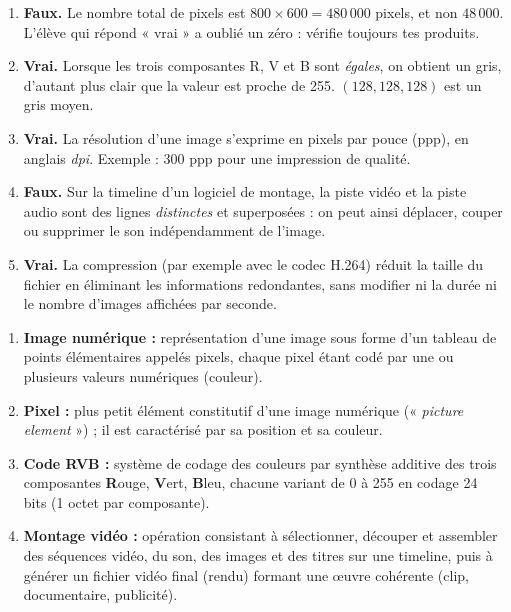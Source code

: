 \documentclass[11pt]{article}
\newcommand{\cle}[1]{{\popxbold\color{popdark}#1}}
\begin{document}
\begin{corrige}
\begin{enumerate}
  \item \textbf{Faux.} Le nombre total de pixels est $800 \times 600 = 480\,000$ pixels, et non $48\,000$. L'élève qui répond « vrai » a oublié un zéro : vérifie toujours tes produits.
  \item \textbf{Vrai.} Lorsque les trois composantes R, V et B sont \emph{égales}, on obtient un gris, d'autant plus clair que la valeur est proche de 255. $(128, 128, 128)$ est un gris moyen.
  \item \textbf{Vrai.} La \cle{résolution} d'une image s'exprime en pixels par pouce (ppp), en anglais \emph{dpi}. Exemple : 300 ppp pour une impression de qualité.
  \item \textbf{Faux.} Sur la timeline d'un logiciel de montage, la piste vidéo et la piste audio sont des lignes \emph{distinctes} et superposées : on peut ainsi déplacer, couper ou supprimer le son indépendamment de l'image.
  \item \textbf{Vrai.} La \cle{compression} (par exemple avec le codec H.264) réduit la taille du fichier en éliminant les informations redondantes, sans modifier ni la durée ni le nombre d'images affichées par seconde.
\end{enumerate}
\end{corrige}

\begin{corrige}
\begin{enumerate}
  \item \textbf{Image numérique :} représentation d'une image sous forme d'un tableau de points élémentaires appelés pixels, chaque pixel étant codé par une ou plusieurs valeurs numériques (couleur).
  \item \textbf{Pixel :} plus petit élément constitutif d'une image numérique (« \emph{picture element} ») ; il est caractérisé par sa position et sa couleur.
  \item \textbf{Code RVB :} système de codage des couleurs par synthèse additive des trois composantes \textbf{R}ouge, \textbf{V}ert, \textbf{B}leu, chacune variant de 0 à 255 en codage 24 bits (1 octet par composante).
  \item \textbf{Montage vidéo :} opération consistant à sélectionner, découper et assembler des séquences vidéo, du son, des images et des titres sur une timeline, puis à générer un fichier vidéo final (rendu) formant une œuvre cohérente (clip, documentaire, publicité).
\end{enumerate}
\end{corrige}
\end{document}
